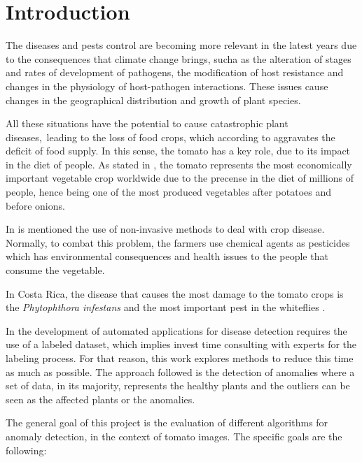 
\chapter{Introduction}
\label{chp:intro}

The diseases and pests control are becoming more relevant in the latest years due to the consequences that climate change brings, sucha as \cite{Coakley1999} the alteration of stages and rates of development of pathogens, the modification of host resistance and changes in the physiology of host-pathogen interactions. These issues cause changes in the geographical distribution and growth of plant species.

All these situations have the potential to cause catastrophic plant diseases, leading to the loss of food crops, which according to \cite{Strange2005} aggravates the deficit of food supply. In this sense, the tomato has a key role, due to its impact in the diet of people. As stated in \cite{Bergougnoux2014}, the tomato represents the most economically important vegetable crop worldwide due to the precense in the diet of millions of people, hence being one of the most produced vegetables after potatoes and before onions.

In \cite{Park2017} is mentioned the use of non-invasive methods to deal with crop disease. Normally, to combat this problem, the farmers use chemical agents as pesticides which has environmental consequences and health issues to the people that consume the vegetable.

In Costa Rica, the disease that causes the most damage to the tomato crops is the \emph{Phytophthora infestans} and the most important pest in the whiteflies \cite{MAG2007}.

In the development of automated applications for disease detection requires the use of a labeled dataset, which implies invest time consulting with experts for the labeling process. For that reason, this work explores methods to reduce this time as much as possible. The approach followed is the detection of anomalies where a set of data, in its majority, represents the healthy plants and the outliers can be seen as the affected plants or the anomalies.

The general goal of this project is the evaluation of different algorithms for anomaly detection, in the context of tomato images. The specific goals are the following:

